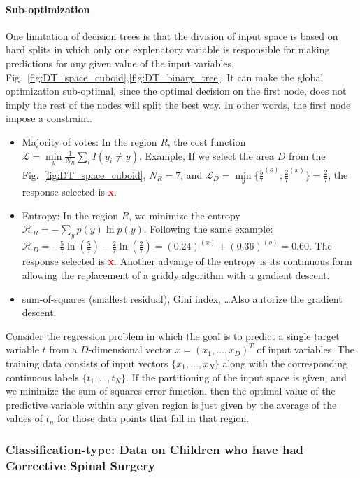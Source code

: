 \documentclass[final, paper=letter,5p,times,twocolumn]{elsarticle}
\begin{document}
\paragraph{Sub-optimization}{One limitation of decision trees is that the division of input space is based on hard splits in which only one explenatory variable is responsible for making predictions for any given value of the input variables, Fig.~\ref{fig:DT_space_cuboid},\ref{fig:DT_binary_tree}. It can make the global optimization sub-optimal, since the optimal decision on the first node, does not imply the rest of the nodes will split the best way. In other words, the first node impose a constraint. }

\begin{itemize}
\item Majority of votes: In the region $R$, the cost function $\mathcal{L} = \underset{y}{\min} \frac{1}{N_{R}}\sum_{i} I(y_{i} \ne y)$. Example, If we select the area $D$ from the Fig.~\ref{fig:DT_space_cuboid}, $N_{R} = 7$, and $\mathcal{L}_{D} = \underset{y}{\min} \{ \frac{5}{7}^{(o)}, \frac{2}{7}^{(x)}\} = \frac{2}{7}$, the response selected is {\bf\textcolor{red}{x}}.
\item Entropy: In the region $R$, we minimize the entropy $\mathcal{H}_{R} = - \sum_{y} p(y)\ln p(y)$. Following the same example: $\mathcal{H}_{D} = -\frac{5}{7}\ln(\frac{5}{7}) - \frac{2}{7}\ln(\frac{2}{7}) = (0.24)^{(x)} + (0.36)^{(o)} = 0.60$. The response selected is {\bf\textcolor{red}{x}}. Another advange of the entropy is its continuous form allowing the replacement of a griddy algorithm with a gradient descent.
  \item sum-of-squares (smallest residual), Gini index, \dots Also autorize the gradient descent.
\end{itemize}

Consider the regression problem in which the goal is to predict a single target variable $t$ from a $D$-dimensional vector $x = (x_{1}, \dots , x_{D})^{T}$ of input variables. The training data consists of input vectors $\{x_{1} , \dots , x_{N} \}$ along with the corresponding continuous labels $\{t_{1} , \dots , t_{N} \}$. If the partitioning of the input space is given, and we minimize the sum-of-squares error function, then the optimal value of the predictive variable within any given region is just given by the average of the values of $t_{n}$ for  those data points that fall in that region.


\subsubsection{Classification-type: Data on Children who have had Corrective Spinal Surgery}
\end{document}
